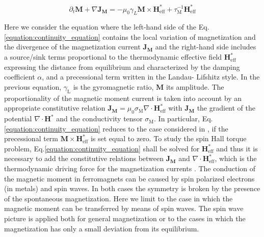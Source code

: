 \documentclass[twocolumn, final]{elsarticle}
\begin{document}
\begin{equation}
\label{equation:continuity_equation}
\partial_t\mathbf{M}+ \nabla\mathbf{J}_{\mathbf{M}}=-\mu_0\gamma_L\mathbf{M}\times\mathbf{H}_{\mathrm{\scriptstyle{eff}}}^* 
+\tau_{\mathrm{\scriptstyle{M}}}^{-1}\mathbf{H}_{\mathrm{\scriptstyle{eff}}}^*
\end{equation}

Here we consider the equation where the left-hand side of the Eq.\ref{equation:continuity_equation} contains the local variation of magnetization and the divergence of the  
magnetization current $\mathbf{J}_{\mathbf{M}}$ and the right-hand side includes a source/sink terms proportional to the thermodynamic effective field $\mathbf{H}
_{\mathrm{\scriptstyle{eff}}}^*$ expressing the distance from equilibrium and characterized by the damping coefficient $\alpha$, and a precessional term written in the Landau-
Lifshitz style. In the previous equation, $\gamma_{\mathrm{\scriptstyle{L}}}$ is the gyromagnetic ratio, $\mathbf{M}$ its amplitude. The proportionality of the magnetic 
moment current is taken into account by an appropriate constitutive relation  $\mathbf{J}_{\mathbf{M}}=\mu_0\sigma_{\mathrm{\scriptstyle{M}}}\nabla\cdot\mathbf{H}
_{\mathrm{\scriptstyle{eff}}}^*$ with $\mathbf{J}_{\mathbf{M}}$  the gradient of the potential $\nabla\cdot\mathbf{H}^*$ and the conductivity tensor $
\sigma_{\mathrm{\scriptstyle{M}}}$. In particular, Eq.\ref{equation:continuity_equation} reduces to the case considered in \cite{basso2016nonequilibrium}, 
\cite{basso2016thermodynamic} if the precessional term  $\mathbf{M} \times\mathbf{H}^*_{\mathrm{\scriptstyle{eff}}}$ is set equal to zero. To study the spin Hall torque 
problem, Eq.\ref{equation:continuity_equation} shall be solved for $\mathbf{H}^*_{\mathrm{\scriptstyle{eff}}}$ and thus it is necessary to add the constitutive relations 
between $\mathbf{J}_{\mathbf{M}} $ and $\nabla\cdot\mathbf{H}^*_{\mathrm{\scriptstyle{eff}}}$, which is the thermodynamic driving force for the magnetization 
currents \cite{basso2016nonequilibrium, basso2016thermodynamic}. The conduction of the magnetic moment in ferromagnets can be caused by spin polarized electrons (in metals) and 
spin waves. In both cases the symmetry is broken by the presence of the spontaneous magnetization. Here we limit to the case in which the magnetic moment can be transferred by 
means of spin waves. The spin wave picture is applied both for  general magnetization or to the cases in which the magnetization has only a small deviation from its equilibrium.
\end{document}
